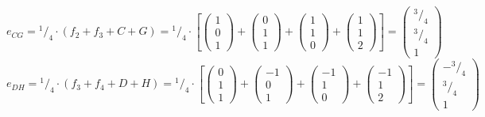 \documentclass{article}
\newcommand*\rfrac[2]{{}^{#1}\!/_{#2}}%
\begin{document}
\[e_{CG}=\rfrac{1}{4}\cdot(f_2+f_3+C+G)=\rfrac{1}{4}\cdot\left[
\left({\begin{array}{c} 1 \\  0 \\ 1 \end{array}}\right)+
\left({\begin{array}{c} 0 \\ 1 \\ 1 \end{array}}\right)+
\left({\begin{array}{c} 1 \\ 1 \\ 0 \end{array}}\right)+
\left({\begin{array}{c} 1 \\  1 \\ 2 \end{array}}\right)\right]=
\left({\begin{array}{c}  \rfrac{3}{4} \\ \rfrac{3}{4} \\ 1 \end{array}}\right)
\]
\[e_{DH}=\rfrac{1}{4}\cdot(f_3+f_4+D+H)=\rfrac{1}{4}\cdot\left[
\left({\begin{array}{c} 0 \\  1 \\ 1 \end{array}}\right)+
\left({\begin{array}{c} -1 \\ 0 \\ 1 \end{array}}\right)+
\left({\begin{array}{c} -1 \\ 1 \\ 0 \end{array}}\right)+
\left({\begin{array}{c} -1 \\  1 \\ 2 \end{array}}\right)\right]=
\left({\begin{array}{c}  -\rfrac{3}{4} \\ \rfrac{3}{4} \\ 1 \end{array}}\right)
\]
\end{document}
